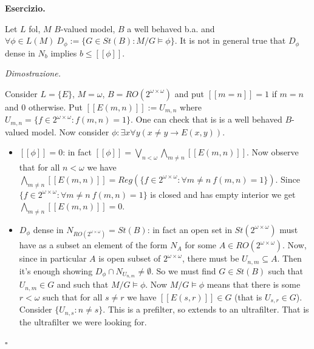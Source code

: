\documentclass[a4paper,12pt]{article}
\newenvironment{exercise}
  {\par\vspace{1em}\noindent\textbf{Esercizio.} }
  {\par\vspace{1em}}
\newenvironment{proof}
  {\par\vspace{0.5em}\noindent\textit{Dimostrazione.} }
  {\par\vspace{1em}\hfill$\square$}
\begin{document}
\begin{exercise}

	Let $L$ fol, $M$ $B$-valued model, $B$ a well behaved b.a. and $\forall \phi \in L(M) \ D_{\phi} := \{ G \in St(B) : M/G \models \phi \}$.
	It is not in general true that $D_{\phi}$ dense in $N_b$ implies $b \leq [[ \phi ]]$.

\end{exercise}

\begin{proof}

	Consider $L = \{E\}$, $M = \omega$, $B = RO(2^{\omega \times \omega})$ and put $[[ m = n ]] = 1$ if $m = n$ and $0$ otherwise. Put $[[ E(m,n) ]] := U_{m,n}$ where 
	$U_{m,n} = \{f \in 2^{\omega \times \omega}: f(m,n) = 1\}$.
	One can check that is is a well behaved $B$-valued model.
	Now consider $\phi : \exists x \forall y (x \not = y \to E(x,y))$.
	\begin{itemize}
		\item	$[[ \phi ]] = 0$: in fact $[[ \phi ]] = \bigvee_{n < \omega} \bigwedge_{m \not = n} [[ E(m,n) ]] $.
			Now observe that for all $n<\omega$ we have $\bigwedge_{m \not = n} [[E(m,n)]] = Reg(\{f \in 2^{\omega \times \omega}: \forall m \not = n \ f(m,n) = 1\})$.
			Since $\{f \in 2^{\omega \times \omega}: \forall m \not = n \ f(m,n) = 1\}$ is closed and has empty interior we get
			 $\bigwedge_{m \not = n} [[E(m,n)]] = 0$.

		 \item	$D_{\phi}$ dense in $N_{RO(2^{\omega \times \omega})} = St(B)$: in fact an open set in $St(2^{\omega \times \omega})$ must have as a subset an element of the form $N_A$ 
			 for some $A \in RO(2^{\omega \times \omega})$. Now, since in particular $A$ is open subset of $2^{\omega \times \omega}$, there must be $U_{n,m} \subseteq A$.
			 Then it's enough showing $D_{\phi} \cap N_{U_{n,m}} \not = \emptyset$.
			 So we must find $G \in St(B)$ such that $U_{n,m} \in G$ and such that $M/G \models \phi$.
			 Now $M/G \models \phi$ means that there is some $r < \omega$ such that for all $s \not = r$ we have $[[ E(s,r) ]] \in G$ (that is $U_{s,r} \in G$).
			 Consider $\{U_{n,s}: n \not = s\}$. This is a prefilter, so extends to an ultrafilter. That is the ultrafilter we were looking for. 
	\end{itemize}

\end{proof}
\end{document}
